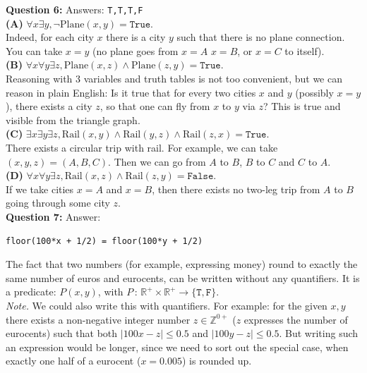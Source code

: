 \documentclass[jou]{apa6}
\begin{document}
\vspace{10pt}
{\bf Question 6:} Answers: {\tt T,T,T,F}\\
{\bf (A)} $\forall x \exists y, \neg \mathrm{Plane}(x,y) = \mathtt{True}$.\\
Indeed, for each city $x$ there is a city $y$ such that there is no plane connection. You can take $x = y$ (no 
plane goes from $x = A$ $x=B$, or $x=C$ to itself).\\
{\bf (B)} $\forall x \forall y \exists z, \mathrm{Plane}(x,z) \wedge \mathrm{Plane}(z,y)  = \mathtt{True}$.\\
Reasoning with $3$ variables and truth tables is not too convenient, but we can reason in plain English:
Is it true that for every two cities $x$ and $y$ (possibly $x = y$), there exists a city $z$, so that
one can fly from $x$ to $y$ via $z$? This is true and visible from the triangle graph.\\
{\bf (C)} $\exists x \exists y \exists z, \mathrm{Rail}(x,y) \wedge \mathrm{Rail}(y,z) \wedge \mathrm{Rail}(z,x) = \mathtt{True}$.\\
There exists a circular trip with rail. For example, we can take $(x,y,z) = (A,B,C)$. Then we can go from $A$ to $B$, 
$B$ to $C$ and $C$ to $A$.\\
{\bf (D)} $\forall x \forall y \exists z, \mathrm{Rail}(x,z) \wedge \mathrm{Rail}(z,y)= \mathtt{False}$.\\
If we take cities $x = A$ and $x = B$, then there exists no two-leg trip from $A$ to $B$ going through some city $z$.\\

\vspace{10pt}
{\bf Question 7:} Answer:
\begin{verbatim}
floor(100*x + 1/2) = floor(100*y + 1/2)
\end{verbatim}
The fact that two numbers (for example, expressing money) round to exactly the same number
of euros and eurocents, can be written without any quantifiers. It is a predicate:
$P(x,y)$, with $P\,:\,\mathbb{R}^{+} \times \mathbb{R}^{+} \rightarrow \{ \mathtt{T},\mathtt{F} \}$.\\
{\em Note.} We could also write this with quantifiers. For example:
for the given $x,y$ there exists a non-negative integer number $z \in \mathbb{Z}^{0+}$ ($z$ expresses 
the number of eurocents) such that both $\left| 100x - z \right| \leq 0.5$ and $\left| 100y - z \right| \leq 0.5$. 
But writing such an expression would be longer, since we need to sort out the special case, when 
exactly one half of a eurocent ($x = 0.005$) is rounded up.
\end{document}
